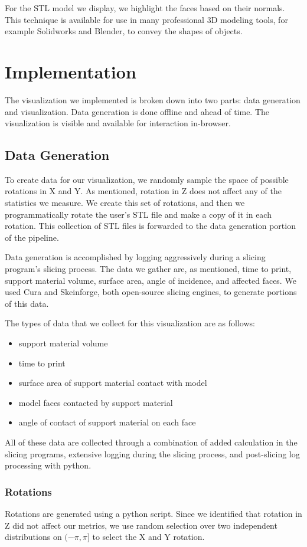 \documentclass{sigchi}
\begin{document}
For the STL model we display, we highlight the faces based on their normals.  This technique is available for use in many professional 3D modeling tools, for example Solidworks and Blender, to convey the shapes of objects.

\section{Implementation}
The visualization we implemented is broken down into two parts: data generation and visualization.  Data generation is done offline and ahead of time.  The visualization is visible and available for interaction in-browser.

\subsection{Data Generation}
To create data for our visualization, we randomly sample the space of possible rotations in X and Y.  As mentioned, rotation in Z does not affect any of the statistics we measure.  We create this set of rotations, and then we programmatically rotate the user's STL file and make a copy of it in each rotation.  This collection of STL files is forwarded to the data generation portion of the pipeline.

Data generation is accomplished by logging aggressively during a slicing program's slicing process.  The data we gather are, as mentioned, time to print, support material volume, surface area, angle of incidence, and affected faces.  We used Cura and Skeinforge, both open-source slicing engines, to generate portions of this data.

The types of data that we collect for this visualization are as follows:
\begin{itemize}
\item support material volume
\item time to print
\item surface area of support material contact with model
\item model faces contacted by support material
\item angle of contact of support material on each face
\end{itemize}

All of these data are collected through a combination of added calculation in the slicing programs, extensive logging during the slicing process, and post-slicing log processing with python.

\subsubsection{Rotations}
Rotations are generated using a python script.  Since we identified that rotation in Z did not affect our metrics, we use random selection over two independent distributions on $(-\pi,\pi]$ to select the X and Y rotation.
\end{document}
